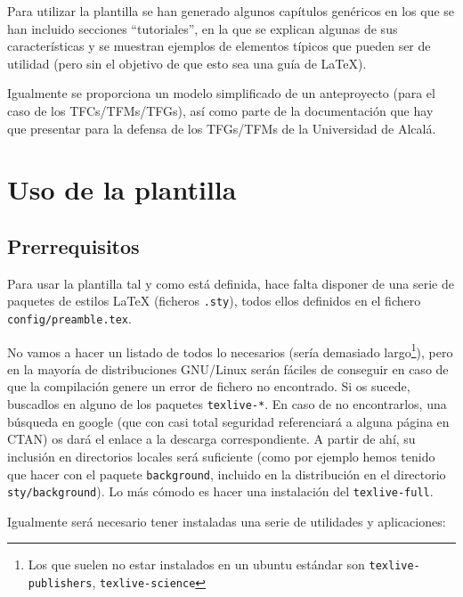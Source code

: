 Para utilizar la plantilla se han generado algunos capítulos genéricos
en los que se han incluido secciones ``tutoriales'', en la que se
explican algunas de sus características y se muestran ejemplos de
elementos típicos que pueden ser de utilidad (pero sin el objetivo de
que esto sea una guía de \LaTeX{}).

Igualmente se proporciona un modelo simplificado de un anteproyecto
(para el caso de los TFCs/TFMs/TFGs), así como parte de la documentación
que hay que presentar para la defensa de los TFGs/TFMs de la Universidad
de Alcalá.



\section{Uso de la plantilla}
\label{sec:uso-generico-de}


\subsection{Prerrequisitos}
\label{sec:prerrequisitos}

Para usar la plantilla tal y como está definida, hace falta disponer de
una serie de paquetes de estilos \LaTeX{} (ficheros \texttt{.sty}),
todos ellos definidos en el fichero \texttt{config/preamble.tex}.

No vamos a hacer un listado de todos lo necesarios (sería demasiado
largo\footnote{Los que suelen no estar instalados en un ubuntu estándar
  son \texttt{texlive-publishers}, \texttt{texlive-science}}), pero en
la mayoría de distribuciones GNU/Linux serán fáciles de conseguir en
caso de que la compilación genere un error de fichero no encontrado. Si
os sucede, buscadlos en alguno de los paquetes \texttt{texlive-*}. En
caso de no encontrarlos, una búsqueda en google (que con casi total
seguridad referenciará a alguna página en CTAN) os dará el enlace a la
descarga correspondiente. A partir de ahí, su inclusión en directorios
locales será suficiente (como por ejemplo hemos tenido que hacer con el
paquete \texttt{background}, incluido en la distribución en el
directorio \texttt{sty/background}). Lo más cómodo es hacer una
instalación del \texttt{texlive-full}. 

Igualmente será necesario tener instaladas una serie de utilidades y
aplicaciones:

